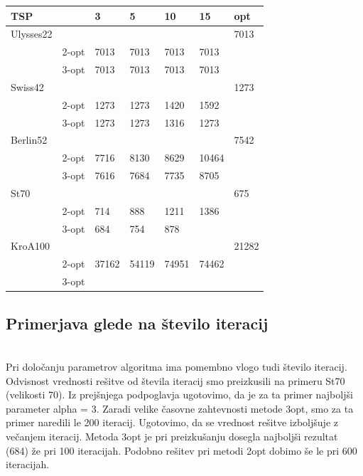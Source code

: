 \documentclass[12pt,a4paper]{amsart}
\theoremstyle{definition} %
\theoremstyle{plain} %
\begin{document}
\begin{table}[h]
\begin{tabular}{lllllll}
\rowcolor[HTML]{FFCCC9} 
TSP       &      & 3 & 5 & 10 & 15 &opt \\ \hline
Ulysses22 &      &   &   &    &  &7013  \\
          & 2-opt & 7013  &  7013 & 7013   & 7013   &\\
          & 3-opt &   7013&  7013 &  7013  &  7013 & \\
Swiss42   &      &   &   &    &   &1273 \\
	& 2-opt &   1273&  1273 &   1420 &  1592 & \\
          & 3-opt &  1273 &  1273 & 1316   &  1273 & \\
Berlin52 &      &   &   &    &   &7542 \\
	 & 2-opt &  7716 & 8130 &   8629 &  10464 & \\
          & 3-opt &  7616 &  7684 &  7735  & 8705  & \\
St70      &      &   &   &    &  & 675 \\
	& 2-opt &  714 &  888 &   1211 &  1386 & \\
          & 3-opt &  684 &  754 &   878 &   & \\
KroA100   &      &   &   &    &  &21282  \\
	& 2-opt &  37162 &  54119 &   74951 &   74462& \\
          & 3-opt &   &   &    &   &
\end{tabular}
\end{table}


\subsection{Primerjava glede na število iteracij} ~\\

Pri določanju parametrov algoritma ima pomembno vlogo tudi število iteracij. Odvisnost vrednosti rešitve od števila iteracij smo preizkusili na primeru St70 (velikosti 70). Iz prejšnjega podpoglavja ugotovimo, da je za ta primer najboljši parameter alpha = 3. Zaradi velike časovne zahtevnosti metode 3opt, smo za ta primer naredili le 200 iteracij. Ugotovimo, da se vrednost rešitve izboljšuje z večanjem iteracij. Metoda 3opt je pri preizkušanju dosegla najboljši rezultat (684) že pri 100 iteracijah. Podobno rešitev pri metodi 2opt dobimo še le pri 600 iteracijah. 
\end{document}
